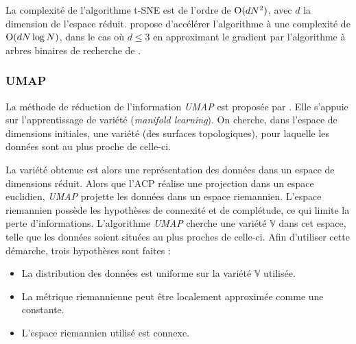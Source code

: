 La complexité de l'algorithme t-SNE est de l'ordre de $\operatorname{O}(d N^2)$, avec $d$ la dimension de l'espace réduit.
\cite{maaten_accelerating_2014} propose d'accélérer l'algorithme à une complexité de $\operatorname{O}(d N \log N)$, dans le cas où $d \le 3$ en approximant le gradient par l'algorithme à arbres binaires de recherche de \citeauthor{barnes_hierarchical_1986} \cite{barnes_hierarchical_1986}.

\subsubsection{UMAP} \label{subsubsec:umap}
La méthode de réduction de l'information \textit{UMAP} est proposée par \citeauthor{mcinnes_umap_2018} \cite{mcinnes_umap_2018, mcinnes_umap_2018a}.
Elle s'appuie sur l'apprentissage de variété (\textit{manifold learning}).
On cherche, dans l'espace de dimensions initiales, une variété (des surfaces topologiques), pour laquelle les données sont au plus proche de celle-ci.

La variété obtenue est alors une représentation des données dans un espace de dimensions réduit.
Alors que l'ACP réalise une projection dans un espace euclidien, \textit{UMAP} projette les données dans un espace riemannien.
L'espace riemannien possède les hypothèses de connexité et de complétude, ce qui limite la perte d'informations.
L'algorithme \textit{UMAP} cherche une variété $\mathbb{V}$ dans cet espace, telle que les données soient situées au plus proches de celle-ci.
Afin d'utiliser cette démarche, trois hypothèses sont faites :
\begin{itemize}
	\item La distribution des données est uniforme sur la variété $\mathbb{V}$ utilisée.
	\item La métrique riemannienne peut être localement approximée comme une constante.
	\item L'espace riemannien utilisé est connexe.
\end{itemize}

